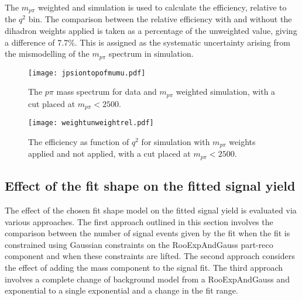 The $m_{p\pi}$ weighted \Lbpijpsi and \Lbpi simulation is used to calculate the efficiency, relative to the \jpsi $q^{2}$ bin. The comparison between the relative efficiency with and without the dihadron weights applied is taken as a percentage of the unweighted value, giving a difference of 7.7\%. This is assigned as the systematic uncertainty arising from the mismodelling of the $m_{p\pi}$ spectrum in simulation. %

\begin{figure}[h!]
  \centering
  \texttt{[image: jpsiontopofmumu.pdf]}
    \caption{The $p\pi$ mass spectrum for \Lbpijpsi data and $m_{p\pi}$ weighted \Lbpi simulation, with a cut placed at $m_{p\pi}<2500$\mevcc.}
  \label{Fig:mppi}

  \end{figure}

\begin{figure}[h!]
  \centering
  \texttt{[image: weightunweightrel.pdf]}
    \caption{The efficiency as function of $q^{2}$ for \Lbpi simulation with $m_{p\pi}$ weights applied and not applied, with a cut placed at $m_{p\pi}<2500$\mevcc.}
  \label{Fig:mppiq2}

  \end{figure}
\FloatBarrier
\subsection{Effect of the fit shape on the fitted signal yield}
\label{sec:sysfit}
The effect of the chosen fit shape model on the fitted signal yield is evaluated via various approaches. The first approach outlined in this section involves the comparison between the number of signal events given by the fit when the fit is constrained using Gaussian constraints on the RooExpAndGauss part-reco component and when these constraints are lifted. The second approach considers the effect of adding the \LbK mass component to the \Lbpi signal fit. The third approach involves a complete change of background  model from a RooExpAndGauss and exponential to a single exponential and a change in the fit range.
